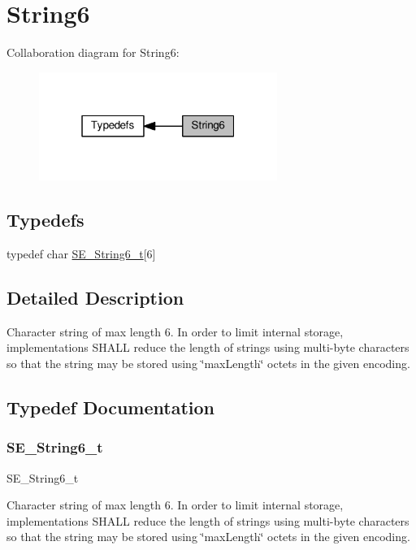 \hypertarget{group__String6}{}\section{String6}
\label{group__String6}
Collaboration diagram for String6\+:\nopagebreak
\begin{figure}[H]
\begin{center}
\leavevmode
\includegraphics[width=220pt]{group__String6}
\end{center}
\end{figure}
\subsection*{Typedefs}
\begin{DoxyCompactItemize}
\item 
typedef char \hyperlink{group__String6_gaabaf8635c2aa9b276e2b92509ddfa136}{S\+E\+\_\+\+String6\+\_\+t}\mbox{[}6\mbox{]}
\end{DoxyCompactItemize}


\subsection{Detailed Description}
Character string of max length 6. In order to limit internal storage, implementations S\+H\+A\+LL reduce the length of strings using multi-\/byte characters so that the string may be stored using \char`\"{}max\+Length\char`\"{} octets in the given encoding. 

\subsection{Typedef Documentation}
\mbox{\label{group__String6_gaabaf8635c2aa9b276e2b92509ddfa136}} 
\subsubsection{\texorpdfstring{S\+E\+\_\+\+String6\+\_\+t}{SE\_String6\_t}}
{\footnotesize\ttfamily S\+E\+\_\+\+String6\+\_\+t}

Character string of max length 6. In order to limit internal storage, implementations S\+H\+A\+LL reduce the length of strings using multi-\/byte characters so that the string may be stored using \char`\"{}max\+Length\char`\"{} octets in the given encoding. 